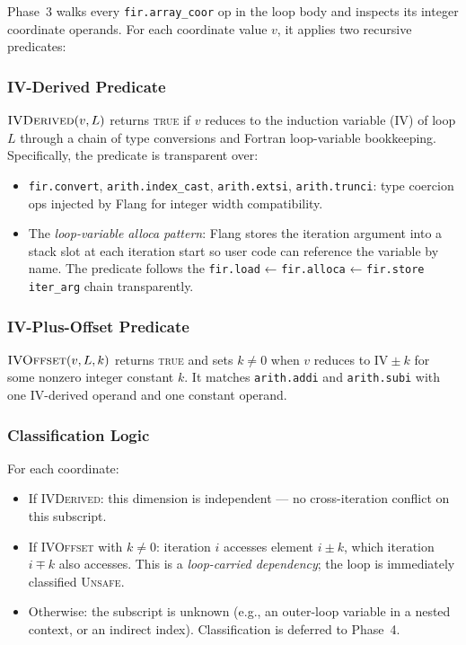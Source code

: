 \documentclass[conference]{IEEEtran}
\begin{document}
Phase~3 walks every \texttt{fir.array\_coor} op in the loop body and
inspects its integer coordinate operands.  For each coordinate value
$v$, it applies two recursive predicates:

\subsubsection{IV-Derived Predicate}

$\textsc{IVDerived}(v, L)$ returns \textsc{true} if $v$ reduces to the
induction variable (IV) of loop $L$ through a chain of type
conversions and Fortran loop-variable bookkeeping.  Specifically, the
predicate is transparent over:
\begin{itemize}
  \item \texttt{fir.convert}, \texttt{arith.index\_cast},
        \texttt{arith.extsi}, \texttt{arith.trunci}: type coercion ops
        injected by Flang for integer width compatibility.
  \item The \emph{loop-variable alloca pattern}: Flang stores the
        iteration argument into a stack slot at each iteration start so
        user code can reference the variable by name.  The predicate
        follows the \texttt{fir.load} ← \texttt{fir.alloca} ←
        \texttt{fir.store iter\_arg} chain transparently.
\end{itemize}

\subsubsection{IV-Plus-Offset Predicate}

$\textsc{IVOffset}(v, L, k)$ returns \textsc{true} and sets $k \ne 0$
when $v$ reduces to $\text{IV} \pm k$ for some nonzero integer
constant $k$.  It matches \texttt{arith.addi} and \texttt{arith.subi}
with one IV-derived operand and one constant operand.

\subsubsection{Classification Logic}

For each coordinate:
\begin{itemize}
  \item If \textsc{IVDerived}: this dimension is independent — no
        cross-iteration conflict on this subscript.
  \item If \textsc{IVOffset} with $k \ne 0$: iteration $i$ accesses
        element $i \pm k$, which iteration $i \mp k$ also accesses.
        This is a \emph{loop-carried dependency}; the loop is
        immediately classified \textsc{Unsafe}.
  \item Otherwise: the subscript is unknown (e.g., an outer-loop
        variable in a nested context, or an indirect index).
        Classification is deferred to Phase~4.
\end{itemize}
\end{document}
